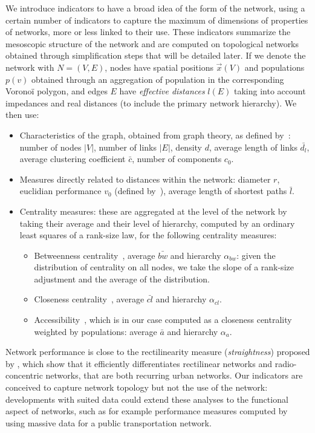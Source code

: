 \documentclass[11pt]{article}
\begin{document}
We introduce indicators to have a broad idea of the form of the network, using a certain number of indicators to capture the maximum of dimensions of properties of networks, more or less linked to their use. These indicators summarize the mesoscopic structure of the network and are computed on topological networks obtained through simplification steps that will be detailed later. If we denote the network with $N=(V,E)$, nodes have spatial positions $\vec{x}(V)$ and populations $p(v)$ obtained through an aggregation of population in the corresponding Voronoï polygon, and edges $E$ have \emph{effective distances} $l(E)$ taking into account impedances and real distances (to include the primary network hierarchy). We then use:

\begin{itemize}
\item Characteristics of the graph, obtained from graph theory, as defined by~\cite{haggett1970network}: number of nodes $\left|V\right|$, number of links $\left|E\right|$, density $d$, average length of links $\bar{d_l}$, average clustering coefficient $\bar{c}$, number of components $c_0$.
\item Measures directly related to distances within the network: diameter $r$, euclidian performance $v_0$ (defined by~\cite{banos2012towards}), average length of shortest paths $\bar{l}$.
\item Centrality measures: these are aggregated at the level of the network by taking their average and their level of hierarchy, computed by an ordinary least squares of a rank-size law, for the following centrality measures:
\begin{itemize}
\item Betweenness centrality~\citep{crucitti2006centrality}, average $\bar{bw}$ and hierarchy $\alpha_{bw}$: given the distribution of centrality on all nodes, we take the slope of a rank-size adjustment and the average of the distribution.
\item Closeness centrality~\citep{crucitti2006centrality}, average $\bar{cl}$ and hierarchy $\alpha_{cl}$.
\item Accessibility~\citep{hansen1959accessibility}, which is in our case computed as a closeness centrality weighted by populations: average $\bar{a}$ and hierarchy $\alpha_{a}$.
\end{itemize}
\end{itemize}

Network performance is close to the rectilinearity measure (\emph{straightness}) proposed by \cite{josselin2016straightness}, which show that it efficiently differentiates rectilinear networks and radio-concentric networks, that are both recurring urban networks. Our indicators are conceived to capture network topology but not the use of the network: developments with suited data could extend these analyses to the functional aspect of networks, such as for example performance measures computed by~\cite{trepanier2009calculation} using massive data for a public transportation network.
\end{document}
